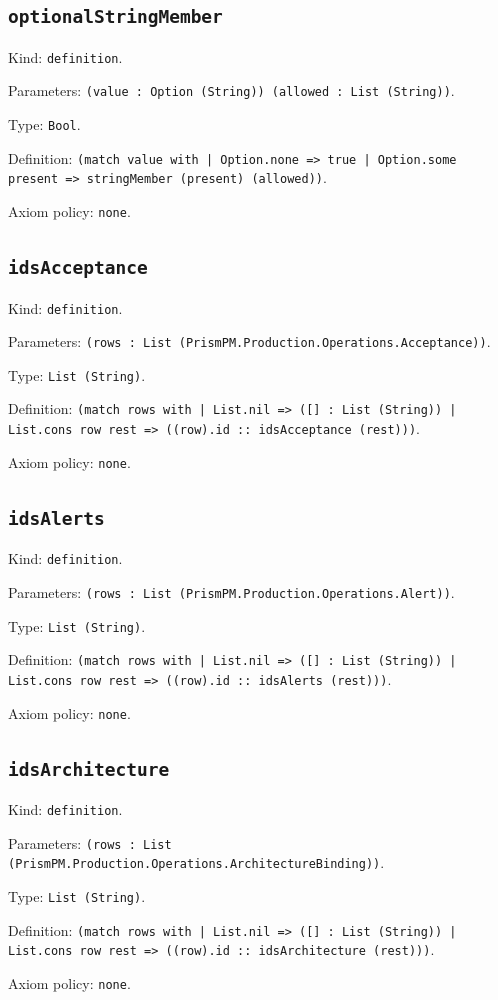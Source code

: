\documentclass[11pt]{article}
\begin{document}
\subsection*{\texttt{optionalStringMember}}
\noindent Kind: \texttt{definition}.\par
\noindent Parameters: \texttt{(value : Option (String)) (allowed : List (String))}.\par
\noindent Type: \texttt{Bool}.\par
\noindent Definition: \texttt{(match value with | Option.none => true | Option.some present => stringMember (present) (allowed))}.\par
\noindent Axiom policy: \texttt{none}.\par
\subsection*{\texttt{idsAcceptance}}
\noindent Kind: \texttt{definition}.\par
\noindent Parameters: \texttt{(rows : List (PrismPM.Production.Operations.Acceptance))}.\par
\noindent Type: \texttt{List (String)}.\par
\noindent Definition: \texttt{(match rows with | List.nil => ([] : List (String)) | List.cons row rest => ((row).id :: idsAcceptance (rest)))}.\par
\noindent Axiom policy: \texttt{none}.\par
\subsection*{\texttt{idsAlerts}}
\noindent Kind: \texttt{definition}.\par
\noindent Parameters: \texttt{(rows : List (PrismPM.Production.Operations.Alert))}.\par
\noindent Type: \texttt{List (String)}.\par
\noindent Definition: \texttt{(match rows with | List.nil => ([] : List (String)) | List.cons row rest => ((row).id :: idsAlerts (rest)))}.\par
\noindent Axiom policy: \texttt{none}.\par
\subsection*{\texttt{idsArchitecture}}
\noindent Kind: \texttt{definition}.\par
\noindent Parameters: \texttt{(rows : List (PrismPM.Production.Operations.ArchitectureBinding))}.\par
\noindent Type: \texttt{List (String)}.\par
\noindent Definition: \texttt{(match rows with | List.nil => ([] : List (String)) | List.cons row rest => ((row).id :: idsArchitecture (rest)))}.\par
\noindent Axiom policy: \texttt{none}.\par
\end{document}
